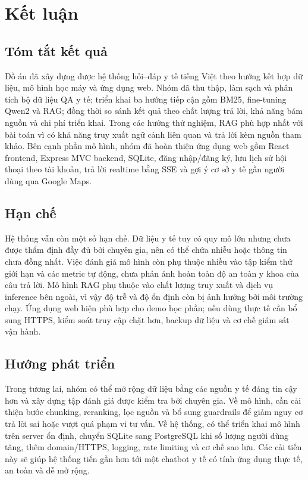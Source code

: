 \documentclass[12pt,a4paper,oneside]{report}
\begin{document}
\chapter{Kết luận}
\label{chap:conclusion}

\section{Tóm tắt kết quả}
Đồ án đã xây dựng được hệ thống hỏi--đáp y tế tiếng Việt theo hướng kết hợp dữ liệu, mô hình học máy và ứng dụng web. Nhóm đã thu thập, làm sạch và phân tích bộ dữ liệu QA y tế; triển khai ba hướng tiếp cận gồm BM25, fine-tuning Qwen2 và RAG; đồng thời so sánh kết quả theo chất lượng trả lời, khả năng bám nguồn và chi phí triển khai. Trong các hướng thử nghiệm, RAG phù hợp nhất với bài toán vì có khả năng truy xuất ngữ cảnh liên quan và trả lời kèm nguồn tham khảo. Bên cạnh phần mô hình, nhóm đã hoàn thiện ứng dụng web gồm React frontend, Express MVC backend, SQLite, đăng nhập/đăng ký, lưu lịch sử hội thoại theo tài khoản, trả lời realtime bằng SSE và gợi ý cơ sở y tế gần người dùng qua Google Maps.

\section{Hạn chế}
Hệ thống vẫn còn một số hạn chế. Dữ liệu y tế tuy có quy mô lớn nhưng chưa được thẩm định đầy đủ bởi chuyên gia, nên có thể chứa nhiễu hoặc thông tin chưa đồng nhất. Việc đánh giá mô hình còn phụ thuộc nhiều vào tập kiểm thử giới hạn và các metric tự động, chưa phản ánh hoàn toàn độ an toàn y khoa của câu trả lời. Mô hình RAG phụ thuộc vào chất lượng truy xuất và dịch vụ inference bên ngoài, vì vậy độ trễ và độ ổn định còn bị ảnh hưởng bởi môi trường chạy. Ứng dụng web hiện phù hợp cho demo học phần; nếu dùng thực tế cần bổ sung HTTPS, kiểm soát truy cập chặt hơn, backup dữ liệu và cơ chế giám sát vận hành.

\section{Hướng phát triển}
Trong tương lai, nhóm có thể mở rộng dữ liệu bằng các nguồn y tế đáng tin cậy hơn và xây dựng tập đánh giá được kiểm tra bởi chuyên gia. Về mô hình, cần cải thiện bước chunking, reranking, lọc nguồn và bổ sung guardrails để giảm nguy cơ trả lời sai hoặc vượt quá phạm vi tư vấn. Về hệ thống, có thể triển khai mô hình trên server ổn định, chuyển SQLite sang PostgreSQL khi số lượng người dùng tăng, thêm domain/HTTPS, logging, rate limiting và cơ chế sao lưu. Các cải tiến này sẽ giúp hệ thống tiến gần hơn tới một chatbot y tế có tính ứng dụng thực tế, an toàn và dễ mở rộng.

\printbibliography[heading=bibintoc,title={Tài liệu tham khảo}]
\end{document}
